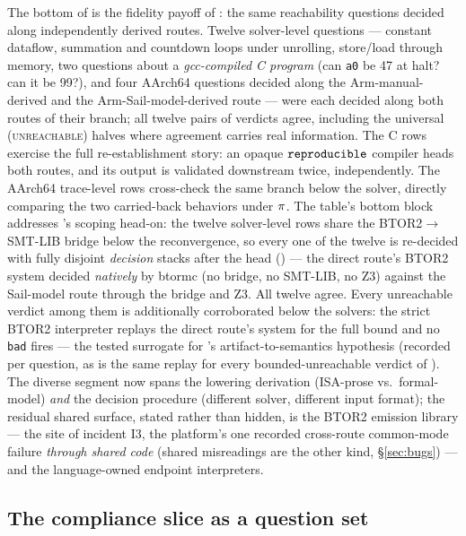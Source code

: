 The bottom of  is the fidelity payoff of
: the same reachability questions decided along
independently derived routes. Twelve solver-level questions ---
constant dataflow, summation and countdown loops under unrolling,
store/load through memory, two questions about a \emph{gcc-compiled C
program} (can \texttt{a0} be 47 at halt? can it be 99?), and four
AArch64 questions decided along the Arm-manual-derived and the
Arm-Sail-model-derived route --- were each decided along both routes of
their branch; all twelve pairs of verdicts agree, including the
universal (\textsc{unreachable}) halves where agreement carries real
information. The C rows exercise the full re-establishment story: an
opaque $\mathtt{reproducible}$ compiler heads both routes, and its output is validated
downstream twice, independently. The AArch64 trace-level rows
cross-check the same branch below the solver, directly comparing the
two carried-back behaviors under $\pi$. The table's bottom block
addresses 's scoping head-on: the twelve
solver-level rows share the BTOR2$\to$SMT-LIB bridge below the
reconvergence, so every one of the twelve is re-decided with fully
disjoint \emph{decision} stacks after the head () --- the direct
route's BTOR2 system
decided \emph{natively} by btormc (no bridge, no SMT-LIB, no Z3)
against the Sail-model route through the bridge and Z3. All twelve
agree. Every unreachable verdict among them is additionally
corroborated below the solvers: the strict BTOR2 interpreter replays
the direct route's system for the full bound and no \texttt{bad} fires
--- the tested surrogate for 's
artifact-to-semantics hypothesis (recorded per question, as is the
same replay for every bounded-unreachable verdict of
). The diverse segment now spans the lowering derivation
(ISA-prose vs.\ formal-model) \emph{and} the decision procedure
(different solver, different input format); the residual shared
surface, stated rather than hidden, is the BTOR2 emission library ---
the site of incident I3, the platform's one recorded cross-route
common-mode failure \emph{through shared code} (shared misreadings are
the other kind, \S\ref{sec:bugs}) --- and the language-owned endpoint
interpreters.

\subsection{The compliance slice as a question set}
\label{sec:eval-bench}

